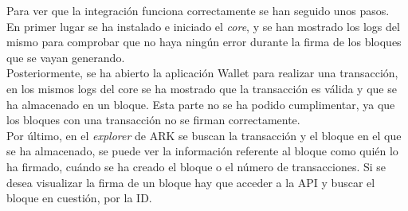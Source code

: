 Para ver que la integración funciona correctamente se han seguido unos pasos.\\ 

En primer lugar se ha instalado e iniciado el \textit{core}, y se han mostrado los logs del mismo para comprobar que no haya ningún error durante la firma de los bloques que se vayan generando.\\

Posteriormente, se ha abierto la aplicación Wallet para realizar una transacción, en los mismos logs del core se ha mostrado que la transacción es válida y que se ha almacenado en un bloque. Esta parte no se ha podido cumplimentar, ya que los bloques con una transacción no se firman correctamente.\\

Por último, en el \textit{explorer} de ARK se buscan la transacción y el bloque en el que se ha almacenado, se puede ver la información referente al bloque como quién lo ha firmado, cuándo se ha creado el bloque o el número de transacciones. Si se desea visualizar la firma de un bloque  hay que acceder a la API y buscar el bloque en cuestión, por la ID.
